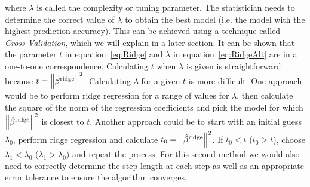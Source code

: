 where $\lambda$ is called the complexity or tuning parameter. The statistician needs to determine the correct value of $\lambda$ to obtain the best model (i.e. the model with the highest prediction accuracy). This can be achieved using a technique called \textit{Cross-Validation}, which we will explain in a later section. It can be shown that the parameter $t$ in equation~\eqref{eq:Ridge} and $\lambda$ in equation~\eqref{eq:RidgeAlt} are in a one-to-one correspondence. Calculating $t$ when $\lambda$ is given is straightforward because $t = \left\lVert\hat{\beta}{}^{\textrm{ridge}}\right\rVert^2$. Calculating $\lambda$ for a given $t$ is more difficult. One approach would be to perform ridge regression for a range of values for $\lambda$, then calculate the square of the norm of the regression coefficients and pick the model for which $\left\lVert\hat{\beta}{}^{\textrm{ridge}}\right\rVert^2$ is closest to $t$. Another approach could be to start with an initial guess $\lambda_0$, perform ridge regression and calculate $t_0 = \left\lVert\hat{\beta}{}^{\textrm{ridge}}\right\rVert^2$. If $t_0 < t$ ($t_0 > t$), choose $\lambda_1 < \lambda_0$ ($\lambda_1 > \lambda_0$) and repeat the process. For this second method we would also need to correctly determine the step length at each step as well as an appropriate error tolerance to ensure the algorithm converges. 

